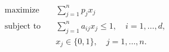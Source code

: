 \begin{align*}
\text{maximize} \quad & \sum_{j=1}^n p_j x_j \\
\text{subject to} \quad & \sum_{j=1}^n a_{ij} x_j \leq 1, \quad i = 1, \ldots, d, \\
& x_j \in \lbrace 0, 1 \rbrace, \quad j = 1, \ldots,n.
\end{align*}
